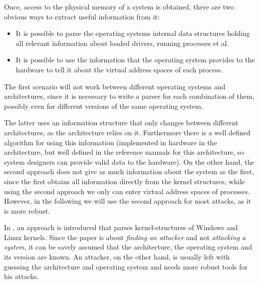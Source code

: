 Once, access to the physical memory of a system is obtained, there are two
obvious ways to extract useful information from it: 
\begin{itemize}

	\item It is possible to parse the operating systems internal data
	structures holding all relevant information about loaded drivers,
	running processes et al.
	
	\item It is possible to use the information that the operating system
	provides to the hardware to tell it about the virtual address spaces of
	each process.
	
\end{itemize}

The first scenario will not work between different operating systems and
architectures, since it is necessary to write a parser for each combination of
them, possibly even for different versions of the same operating system. 

The latter uses an information structure that only changes between different
architectures, as the architecture relies on it. Furthermore there is a well
defined algorithm for using this information (implemented in hardware in the
architecture, but well defined in the reference manuals for this architecture,
so system designers can provide valid data to the hardware). On the other hand,
the second approach does not give as much information about the system as the
first, since the first obtains all information directly from the kernel
structures, while using the second approach we only can enter virtual address
spaces of processes. However, in the following we will use the second approach
for most attacks, as it is more robust.

In \cite{finding_digital_evidence_in_physical_memory:2006}, an approach is
introduced that parses kernel-structures of Windows and Linux kernels. Since the
paper is about \emph{finding an attacker} and not \emph{attacking a system}, it
can be savely assumed that the architecture, the operating system and its
version are known. An attacker, on the other hand, is usually left with guessing
the architecture and operating system and needs more robust tools for his
attacks.%

